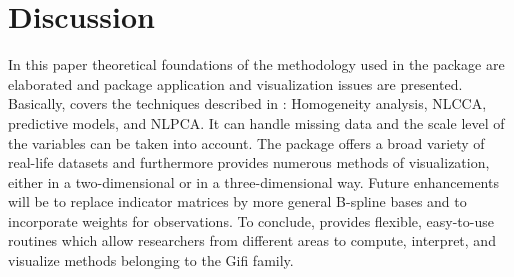 \documentclass[article, nojss]{jss}
\begin{document}
\section{Discussion}
In this paper theoretical foundations of the methodology used in the  package are elaborated and package application and visualization issues are presented. Basically,  covers the techniques described in \citet{Gifi:90}: Homogeneity analysis, NLCCA, predictive models, and NLPCA. It can handle missing data and the scale level of the variables can be taken into account. The package offers a broad variety of real-life datasets and furthermore provides numerous methods of visualization, either in a two-dimensional or in a three-dimensional way. Future enhancements will be to replace indicator matrices by more general B-spline bases and to incorporate weights for observations. To conclude,  provides flexible, easy-to-use routines which allow researchers from different areas to compute, interpret, and visualize methods belonging to the Gifi family. 


\end{document}
